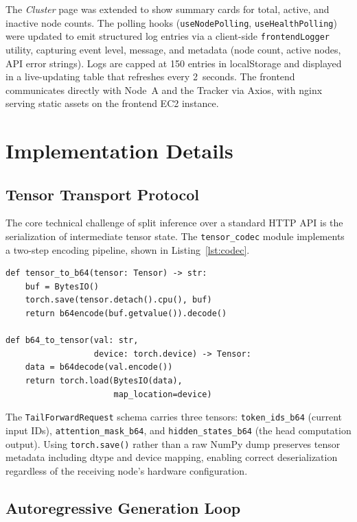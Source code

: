 \documentclass[conference]{IEEEtran}
\begin{document}
The \emph{Cluster} page was extended to show summary cards for total, active,
and inactive node counts. The polling hooks (\texttt{useNodePolling},
\texttt{useHealthPolling}) were updated to emit structured log entries via a
client-side \texttt{frontendLogger} utility, capturing event level, message,
and metadata (node count, active nodes, API error strings). Logs are capped at
150 entries in localStorage and displayed in a live-updating table that
refreshes every 2~seconds. The frontend communicates directly with Node~A and
the Tracker via Axios, with nginx serving static assets on the frontend EC2
instance.

\section{Implementation Details}

\subsection{Tensor Transport Protocol}

The core technical challenge of split inference over a standard HTTP API is the
serialization of intermediate tensor state. The \texttt{tensor\_codec} module
implements a two-step encoding pipeline, shown in Listing~\ref{lst:codec}.

\begin{lstlisting}[caption={Tensor codec: PyTorch binary format over base64-encoded HTTP.}, label={lst:codec}]
def tensor_to_b64(tensor: Tensor) -> str:
    buf = BytesIO()
    torch.save(tensor.detach().cpu(), buf)
    return b64encode(buf.getvalue()).decode()

def b64_to_tensor(val: str,
                  device: torch.device) -> Tensor:
    data = b64decode(val.encode())
    return torch.load(BytesIO(data),
                      map_location=device)
\end{lstlisting}

The \texttt{TailForwardRequest} schema carries three tensors:
\texttt{token\_ids\_b64} (current input IDs), \texttt{attention\_mask\_b64},
and \texttt{hidden\_states\_b64} (the head computation output). Using
\texttt{torch.save()} rather than a raw NumPy dump preserves tensor metadata
including dtype and device mapping, enabling correct deserialization regardless
of the receiving node's hardware configuration.

\subsection{Autoregressive Generation Loop}
\end{document}

